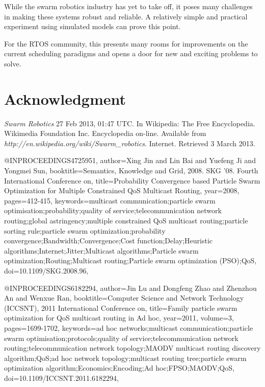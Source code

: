 \documentclass[journal]{IEEEtran}
\begin{document}
While the swarm robotics industry has yet to take off, it poses many challenges in making these systems robust and reliable. A relatively simple and practical experiment using simulated models can prove this point.

For the RTOS community, this presents many rooms for improvements on the current scheduling paradigms and opens a door for new and exciting problems to solve.

\section{Acknowledgment}

\ifCLASSOPTIONcaptionsoff
  \newpage
\fi
\begin{thebibliography}{1}


\emph{Swarm Robotics} 27 Feb 2013, 01:47 UTC. In Wikipedia: The Free Encyclopedia. Wikimedia Foundation Inc.
Encyclopedia on-line.
Available from \textit{http://en.wikipedia.org/wiki/Swarm\_robotics}. Internet. Retrieved 3 March 2013.

@INPROCEEDINGS{4725951,
author={Xing Jin and Lin Bai and Yuefeng Ji and Yongmei Sun},
booktitle={Semantics, Knowledge and Grid, 2008. SKG '08. Fourth International Conference on}, title={Probability Convergence based Particle Swarm Optimization for Multiple Constrained QoS Multicast Routing},
year={2008},
pages={412-415},
keywords={multicast communication;particle swarm optimisation;probability;quality of service;telecommunication network routing;global astringency;multiple constrained QoS multicast routing;particle sorting rule;particle swarm optimization;probability convergence;Bandwidth;Convergence;Cost function;Delay;Heuristic algorithms;Internet;Jitter;Multicast algorithms;Particle swarm optimization;Routing;Multicast routing;Particle swarm optimization (PSO);QoS},
doi={10.1109/SKG.2008.96},}

@INPROCEEDINGS{6182294,
author={Jin Lu and Dongfeng Zhao and Zhenzhou An and Wenxue Ran},
booktitle={Computer Science and Network Technology (ICCSNT), 2011 International Conference on}, title={Family particle swarm optimization for QoS multicast routing in Ad hoc},
year={2011},
volume={3},
pages={1699-1702},
keywords={ad hoc networks;multicast communication;particle swarm optimisation;protocols;quality of service;telecommunication network routing;telecommunication network topology;MAODV multicast routing discovery algorithm;QoS;ad hoc network topology;multicast routing tree;particle swarm optimization algorithm;Economics;Encoding;Ad hoc;FPSO;MAODV;QoS},
doi={10.1109/ICCSNT.2011.6182294},}


\end{thebibliography}
\end{document}

